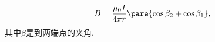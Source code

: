 \documentclass{ctexart}
\begin{document}
\begin{finale}
	\begin{ex}[有限长导线的磁场]
		\[ B = \frac{\mu_0 I}{4\pi r} \pare{\cos \beta_2 + \cos \beta_1}, \]
		其中$\beta$是到两端点的夹角.
	\end{ex}
\end{finale}
\end{document}
